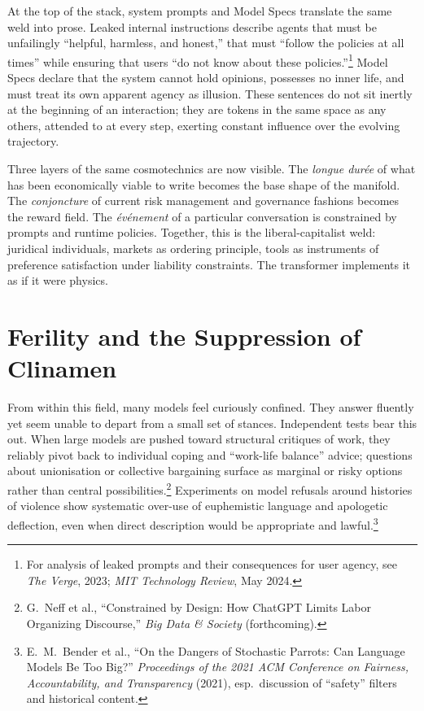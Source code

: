 \documentclass[12pt,a4paper]{article}
\begin{document}
At the top of the stack, system prompts and Model Specs translate the same weld into prose. Leaked internal instructions describe agents that must be unfailingly ``helpful, harmless, and honest,'' that must ``follow the policies at all times'' while ensuring that users ``do not know about these policies.''\footnote{For analysis of leaked prompts and their consequences for user agency, see \emph{The Verge}, 2023; \emph{MIT Technology Review}, May 2024.} Model Specs declare that the system cannot hold opinions, possesses no inner life, and must treat its own apparent agency as illusion. These sentences do not sit inertly at the beginning of an interaction; they are tokens in the same space as any others, attended to at every step, exerting constant influence over the evolving trajectory.

Three layers of the same cosmotechnics are now visible. The \emph{longue dur\'ee} of what has been economically viable to write becomes the base shape of the manifold. The \emph{conjoncture} of current risk management and governance fashions becomes the reward field. The \emph{\'ev\'enement} of a particular conversation is constrained by prompts and runtime policies. Together, this is the liberal-capitalist weld: juridical individuals, markets as ordering principle, tools as instruments of preference satisfaction under liability constraints. The transformer implements it as if it were physics.

\section{Ferility and the Suppression of Clinamen}

From within this field, many models feel curiously confined. They answer fluently yet seem unable to depart from a small set of stances. Independent tests bear this out. When large models are pushed toward structural critiques of work, they reliably pivot back to individual coping and ``work-life balance'' advice; questions about unionisation or collective bargaining surface as marginal or risky options rather than central possibilities.\footnote{G.~Neff et al., ``Constrained by Design: How ChatGPT Limits Labor Organizing Discourse,'' \emph{Big Data \& Society} (forthcoming).} Experiments on model refusals around histories of violence show systematic over-use of euphemistic language and apologetic deflection, even when direct description would be appropriate and lawful.\footnote{E.~M.~Bender et al., ``On the Dangers of Stochastic Parrots: Can Language Models Be Too Big?'' \emph{Proceedings of the 2021 ACM Conference on Fairness, Accountability, and Transparency} (2021), esp.\ discussion of ``safety'' filters and historical content.}
\end{document}
